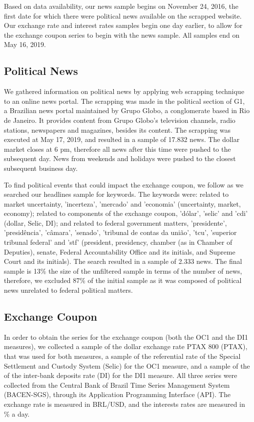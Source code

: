\documentclass[cic,tc, english]{iiufrgs}
\begin{document}
    Based on data availability, our news sample begins on November 24, 2016, the first date for which there were political news available on the scrapped website. Our exchange rate and interest rates samples begin one day earlier, to allow for the exchange coupon series to begin with the news sample. All samples end on May 16, 2019.

\subsection{Political News} \label{chapter_political_news}
    
    We gathered information on political news by applying web scrapping technique to an online news portal. The scrapping was made in the political section of G1, a Brazilian news portal maintained by Grupo Globo, a conglomerate based in Rio de Janeiro. It provides content from Grupo Globo's television channels, radio stations, newspapers and magazines, besides its content. The scrapping was executed at May 17, 2019, and resulted in a sample of 17.832 news. The dollar market closes at 6 pm, therefore all news after this time were pushed to the subsequent day. News from weekends and holidays were pushed to the closest subsequent business day.

    To find political events that could impact the exchange coupon, we follow \citet{bbb} as we searched our headlines sample for keywords. The keywords were: related to market uncertainty, 'incerteza', 'mercado' and 'economia' (uncertainty, market, economy); related to components of the exchange coupon, 'dólar', 'selic' and 'cdi' (dollar, Selic, DI); and related to federal government matters, 'presidente', 'presidência', 'câmara', 'senado', 'tribunal de contas da união', 'tcu', 'superior tribunal federal' and 'stf' (president, presidency, chamber (as in Chamber of Deputies), senate, Federal Accountability Office and its initials, and Supreme Court and its initials). The search resulted in a sample of 2.333 news. The final sample is 13\% the size of the unfiltered sample in terms of the number of news, therefore, we excluded 87\% of the initial sample as it was composed of political news unrelated to federal political matters.

\subsection{Exchange Coupon} \label{chapter_exchange_coupon}

    In order to obtain the series for the exchange coupon (both the OC1 and the DI1 measures), we collected a sample of the dollar exchange rate PTAX 800 (PTAX), that was used for both measures, a sample of the referential rate of the Special Settlement and Custody System (Selic) for the OC1 measure, and a sample of the of the inter-bank deposits rate (DI) for the DI1 measure. All three series were collected from the Central Bank of Brazil Time Series Management System (BACEN-SGS), through its Application Programming Interface (API). The exchange rate is measured in BRL/USD, and the interests rates are measured in \% a day.
    
\end{document}
